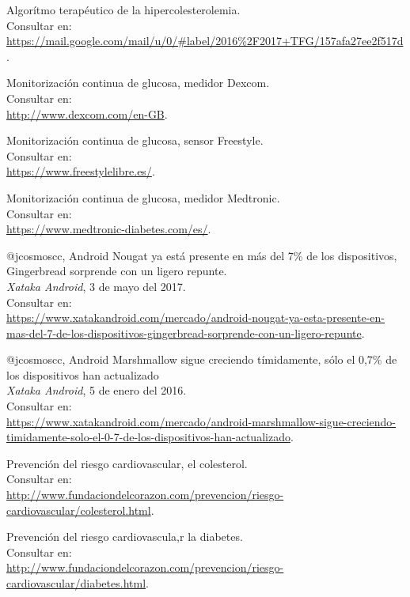 \documentclass[11pt,spanish,
		listoftables,listoffigures]
		{tfgplantilla}
\begin{document}
\begin{thebibliography}{10}
   Algorítmo terapéutico de la hipercolesterolemia.\\
   \newblock Consultar en:\\
   \url{ https://mail.google.com/mail/u/0/\#label/2016\%2F2017+TFG/157afa27ee2f517d}.

   Monitorización continua de glucosa, medidor Dexcom.\\
   \newblock Consultar en:\\
   \url{ http://www.dexcom.com/en-GB}.

   Monitorización continua de glucosa, sensor Freestyle.\\
   \newblock Consultar en:\\
   \url{ https://www.freestylelibre.es/}.

   Monitorización continua de glucosa, medidor Medtronic.\\
   \newblock Consultar en:\\
   \url{ https://www.medtronic-diabetes.com/es/}.

   @jcosmoscc,
   \newblock Android Nougat ya está presente en más del 7\% de los dispositivos, Gingerbread sorprende con un ligero repunte.\\
   \newblock \textit{Xataka Android}, 3 de mayo del 2017.\\
   \newblock Consultar en:\\
   \url{ https://www.xatakandroid.com/mercado/android-nougat-ya-esta-presente-en-mas-del-7-de-los-dispositivos-gingerbread-sorprende-con-un-ligero-repunte}.

   @jcosmoscc, 
   \newblock Android Marshmallow sigue creciendo tímidamente, sólo el 0,7\% de los dispositivos han actualizado\\
   \newblock \textit{Xataka Android}, 5 de enero del 2016.\\
   \newblock Consultar en:\\
   \url{ https://www.xatakandroid.com/mercado/android-marshmallow-sigue-creciendo-timidamente-solo-el-0-7-de-los-dispositivos-han-actualizado}.

   Prevención del riesgo cardiovascular, el colesterol.\\	
   \newblock Consultar en:\\
   \url{ http://www.fundaciondelcorazon.com/prevencion/riesgo-cardiovascular/colesterol.html}.

   Prevención del riesgo cardiovascula,r la diabetes.\\	
   \newblock Consultar en:\\
   \url{ http://www.fundaciondelcorazon.com/prevencion/riesgo-cardiovascular/diabetes.html}.


\end{thebibliography}
\end{document}
